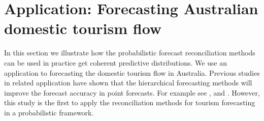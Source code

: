 \documentclass[12pt]{article}
\theoremstyle{definition}
\begin{document}

%
%
%


\section{Application: Forecasting Australian domestic tourism flow}\label{sec:Application}

In this section we illustrate how the probabilistic forecast reconciliation methods can be used in practice get coherent predictive distributions. We use an application to forecasting the domestic tourism flow in Australia. Previous studies in related application have shown that the hierarchical forecasting methods will improve the forecast accuracy in point forecasts. For example see \cite{AthEtAl2009}, \cite{Hyndman2011} and \cite{WicEtAl2019}. However, this study is the first to apply the reconciliation methods for tourism forecasting in a probabilistic framework. 
\end{document}
